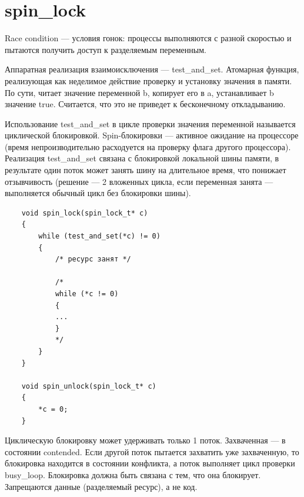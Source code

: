 
\section{spin\_lock}

Race condition --- условия гонок: процессы выполняются с разной скоростью и пытаются получить доступ к разделяемым переменным. 

Аппаратная реализация взаимоисключения --- test\_and\_set. Атомарная функция, реализующая как неделимое действие проверку и установку значения в памяти. По сути, читает значение переменной b, копирует его в a, устанавливает b значение true. Считается, что это не приведет к бесконечному откладыванию. 

Использование test\_and\_set в цикле проверки значения переменной называется циклической блокировкой. Spin-блокировки --- активное ожидание на процессоре (время непроизводительно расходуется на проверку флага другого процессора). Реализация test\_and\_set связана с блокировкой локальной шины памяти, в результате один поток может занять шину на длительное время, что понижает отзывчивость (решение --- 2 вложенных цикла, если переменная занята --- выполняется обычный цикл без блокировки шины).

\begin{lstlisting}
	void spin_lock(spin_lock_t* c)
	{
		while (test_and_set(*c) != 0)
		{
			/* ресурс занят */
			
			/*
			while (*c != 0) 
			{
			...
			}
			*/
		}
	}
	
	void spin_unlock(spin_lock_t* c)
	{
		*c = 0;
	}
\end{lstlisting}

Циклическую блокировку может удерживать только 1 поток. Захваченная --- в состоянии contended. Если другой поток пытается захватить уже захваченную, то блокировка находится в состоянии конфликта, а поток выполняет цикл проверки busy\_loop. Блокировка должна быть связана с тем, что она блокирует. Запрещаются данные (разделяемый ресурс), а не код.

